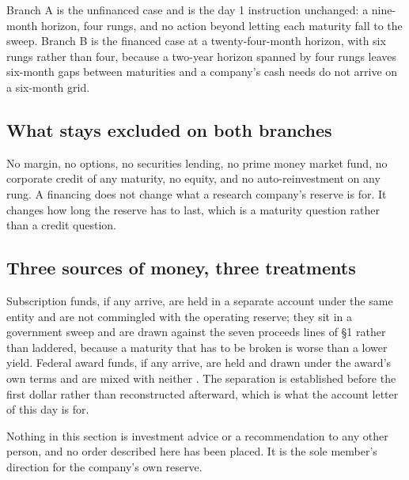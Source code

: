 Branch A is the unfinanced case and is the day 1 instruction unchanged: a
nine-month horizon, four rungs, and no action beyond letting each maturity fall
to the sweep. Branch B is the financed case at a twenty-four-month horizon, with
six rungs rather than four, because a two-year horizon spanned by four rungs
leaves six-month gaps between maturities and a company's cash needs do not arrive
on a six-month grid.

\subsection{What stays excluded on both branches}

No margin, no options, no securities lending, no prime money market fund, no
corporate credit of any maturity, no equity, and no auto-reinvestment on any
rung. A financing does not change what a research company's reserve is for. It
changes how long the reserve has to last, which is a maturity question rather
than a credit question.

\subsection{Three sources of money, three treatments}

Subscription funds, if any arrive, are held in a separate account under the same
entity and are not commingled with the operating reserve; they sit in a
government sweep and are drawn against the seven proceeds lines of \S1 rather
than laddered, because a maturity that has to be broken is worse than a lower
yield. Federal award funds, if any arrive, are held and drawn under the award's
own terms and are mixed with neither \cite{movein2026}. The separation is
established before the first dollar rather than reconstructed afterward, which is
what the account letter of this day is for.

Nothing in this section is investment advice or a recommendation to any other
person, and no order described here has been placed. It is the sole member's
direction for the company's own reserve.
